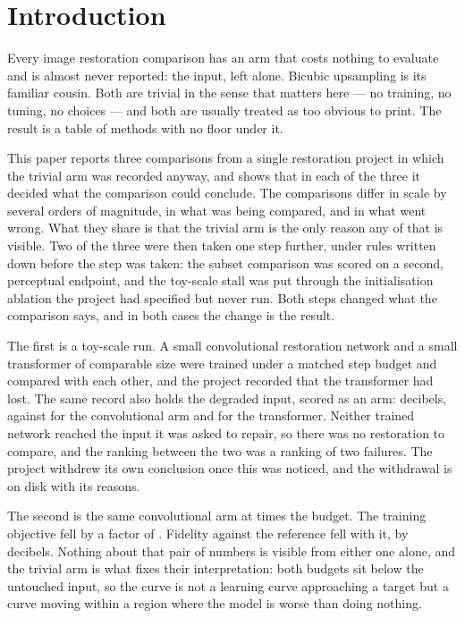 \section{Introduction}

Every image restoration comparison has an arm that costs nothing to evaluate and
is almost never reported: the input, left alone. Bicubic upsampling is its
familiar cousin. Both are trivial in the sense that matters here --- no training,
no tuning, no choices --- and both are usually treated as too obvious to print.
The result is a table of methods with no floor under it.

This paper reports three comparisons from a single restoration project in which
the trivial arm was recorded anyway, and shows that in each of the three it
decided what the comparison could conclude. The comparisons differ in scale by
several orders of magnitude, in what was being compared, and in what went wrong.
What they share is that the trivial arm is the only reason any of that is
visible. Two of the three were then taken one step further, under rules written
down before the step was taken: the subset comparison was scored on a second,
perceptual endpoint, and the toy-scale stall was put through the initialisation
ablation the project had specified but never run. Both steps changed what the
comparison says, and in both cases the change is the result.

The first is a toy-scale run. A small convolutional restoration network and a
small transformer of comparable size were trained under a matched step budget and
compared with each other, and the project recorded that the transformer had lost.
The same record also holds the degraded input, scored as an arm: \ToyDegraded{}
decibels, against \ToyConv{} for the convolutional arm and \ToyTrans{} for the
transformer. Neither trained network reached the input it was asked to repair, so
there was no restoration to compare, and the ranking between the two was a
ranking of two failures. The project withdrew its own conclusion once this was
noticed, and the withdrawal is on disk with its reasons.

The second is the same convolutional arm at \BudgetMultiple{} times the budget.
The training objective fell by a factor of \ToyLossDrop{}. Fidelity against the
reference fell with it, by \ToyLongRegression{} decibels. Nothing about that pair
of numbers is visible from either one alone, and the trivial arm is what fixes their
interpretation: both budgets sit below the untouched input, so the curve is not a
learning curve approaching a target but a curve moving within a region where the
model is worse than doing nothing.

